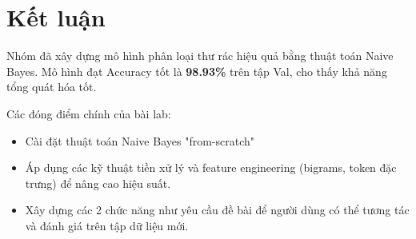 \section{Kết luận}
 Nhóm đã xây dựng mô hình phân loại thư rác hiệu quả bằng thuật toán Naive Bayes. Mô hình đạt Accuracy tốt là \textbf{98.93\%} trên tập Val, cho thấy khả năng tổng quát hóa tốt.

Các đóng điểm chính của bài lab:
\begin{itemize}
    \item Cài đặt thuật toán Naive Bayes "from-scratch"
    \item Áp dụng các kỹ thuật tiền xử lý và feature engineering (bigrams, token đặc trưng) để nâng cao hiệu suất.
    \item Xây dựng các 2 chức năng như yêu cầu đề bài để người dùng có thể tương tác và đánh giá trên tập dữ liệu mới.
\end{itemize}